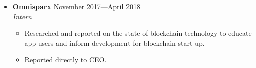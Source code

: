 \documentclass[12pt,letterpaper]{article}
\newenvironment{explist}
{\begin{itemize}[label=\textbf{--},itemsep=1pt,topsep=0pt,partopsep=0pt,parsep=0pt]}
{\end{itemize}}
\begin{document}
\begin{itemize}[label=,itemsep=0pt]
	\item
	\textbf{Omnisparx} \hfill November 2017---April 2018\\
	\textit{Intern}
	\begin{explist}
		\item Researched and reported on the state of blockchain technology to educate app users and inform development for blockchain start-up.
		\item Reported directly to CEO.
	\end{explist}
\end{itemize}
\end{document}
